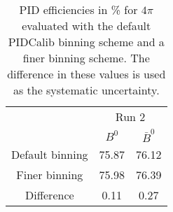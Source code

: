 \begin{table}
    \centering
    \begin{tabular}{ccc}
    \toprule
& \multicolumn{2}{c}{Run 2}\\
& $B^0$ & $\bar{B}^0$\\
    \midrule
Default binning & 75.87 & 76.12\\
Finer binning & 75.98 & 76.39\\
Difference & 0.11 & 0.27\\
    \bottomrule
    \end{tabular}
    \caption{PID efficiencies in \% for $4\pi$ evaluated with the default PIDCalib binning scheme and a finer binning scheme. The difference in these values is used as the systematic uncertainty.}
\label{tab:final_PID_pipipipi}
\end{table}
